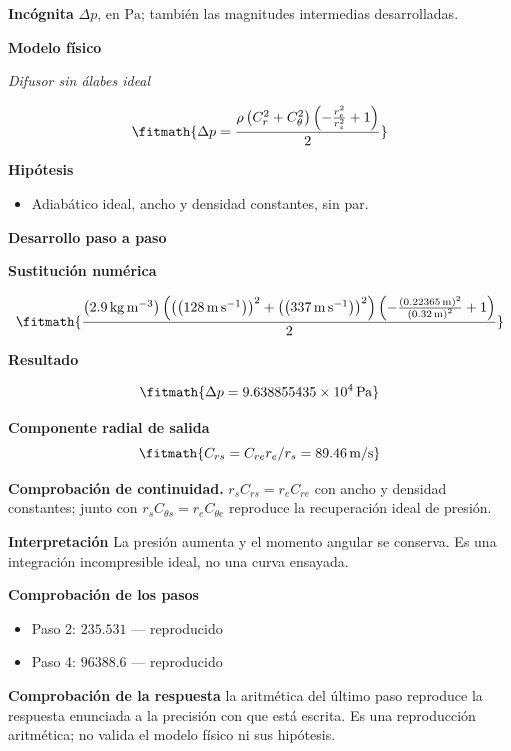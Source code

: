 \documentclass[10pt,openany]{book}
\begin{document}
\noindent\textbf{Incógnita}
$\Delta p$, en $\mathrm{Pa}$; también las magnitudes intermedias desarrolladas.

\noindent\textbf{Modelo físico}

\noindent\textit{Difusor sin álabes ideal}

\[
\fitmath{\Delta p=\frac{\rho \left(C_r^{2} + C_\theta^{2}\right) \left(- \frac{r_e^{2}}{r_s^{2}} + 1\right)}{2}}
\]

\noindent\textbf{Hipótesis}
\begin{itemize}
\item Adiabático ideal, ancho y densidad constantes, sin par.
\end{itemize}

\noindent\textbf{Desarrollo paso a paso}



\noindent\textbf{Sustitución numérica}

\[
\fitmath{\frac{\left(2.9\,\mathrm{kg}\,\mathrm{m}^{-3}\right) \left(\left(\left(128\,\mathrm{m}\,\mathrm{s}^{-1}\right)\right)^{2} + \left(\left(337\,\mathrm{m}\,\mathrm{s}^{-1}\right)\right)^{2}\right) \left(- \frac{\left(0.22365\,\mathrm{m}\right)^{2}}{\left(0.32\,\mathrm{m}\right)^{2}} + 1\right)}{2}}
\]

\noindent\textbf{Resultado}

\[
\fitmath{\Delta p=9.638855435\times10^{4}\,\mathrm{Pa}}
\]

\noindent\textbf{Componente radial de salida}
\[
\fitmath{C_{rs}=C_{re}r_e/r_s=89.46\,\mathrm{m/s}}
\]

\noindent\textbf{Comprobación de continuidad.} $r_sC_{rs}=r_eC_{re}$ con ancho y densidad constantes; junto con $r_sC_{\theta s}=r_eC_{\theta e}$ reproduce la recuperación ideal de presión.

\noindent\textbf{Interpretación}
La presión aumenta y el momento angular se conserva. Es una integración incompresible ideal, no una curva ensayada.

\noindent\textbf{Comprobación de los pasos}
\begin{itemize}
\item Paso 2: $235.531$ — reproducido
\item Paso 4: $96388.6$ — reproducido
\end{itemize}

\noindent\textbf{Comprobación de la respuesta} la aritmética del último paso reproduce la respuesta enunciada a la precisión con que está escrita. Es una reproducción aritmética; no valida el modelo físico ni sus hipótesis.
\end{document}
